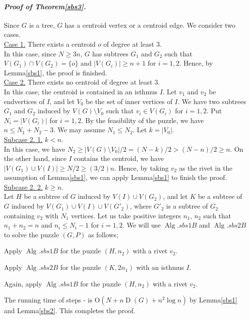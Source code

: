 \documentclass[letter,11pt]{article}
\newcommand{\white}{\qquad{\framebox{\rule{0pt}{4pt}}}}
\newcommand{\owari}{\hfill\white}
\theoremstyle{definition}
\theoremstyle{definition}
\DeclareMathOperator{\Alg}{Alg}
\DeclareMathOperator{\D}{D}
\newcommand{\1}{\boldmath$~1~$\unboldmath}
\newcommand{\Ord}{\mathrm{O}}
\newcommand{\qedgo}{\vspace{0.35cm}}
\newcommand{\tume}{\hspace*{0.2em}}
\newcommand{\maru}[1]{{\ooalign{\hfill$\small#1$\hfill\crcr\scalebox{1.3}{$\bigcirc$}}}}
\newenvironment{alg-enumerate}{%
  \begin{enumerate}%
   \renewcommand{\theenumi}{\arabic{enumi}}%
   \renewcommand{\labelenumi}{\rm{{\maru{\theenumi}}\tume\/}}%
   \renewcommand{\labelenumii}{\rm{$(${\maru{\theenumi}}-\theenumii$)$\tume\/}}%
 }{\end{enumerate}%
}
\newenvironment{Proofof}[1]{\expandafter
\paragraph{{\it Proof of #1.}}}{\hspace{5mm}\owari\qedgo}
\begin{document}
\begin{Proofof}{Theorem\tume\ref{sbs3}}
Since $G$ is a tree, $G$ has a centroid vertex or a centroid edge.
We consider two cases.
\medskip\\
\underline{Case 1.} There exists a centroid $o$ of degree at least $3$.
\medskip\\
In this case, since $N \ge 3n$, $G$ has subtrees $G_1$ and $G_2$ such that $V(G_1) \cap V(G_2) = \{ o \}$ and $|V(G_i)| \ge n + 1$ for $i=1, 2$.
Hence, by Lemma\tume\ref{sbs1}, the proof is finished.
\medskip\\
\underline{Case 2.} There exists no centroid of degree at least $3$.
\medskip\\  
In this case, the centroid is contained in an isthmus $I$.
Let $v_1$ and $v_2$ be endvertices of $I$, and let $V_0$ be the set of inner vertices of $I$.
We have two subtrees $G_1$ and $G_2$ induced by $V(G) \setminus V_0$ such that $v_i \in V(G_i)$ for $i = 1, 2$.
Put $N_i = |V(G_i)|$ for $i = 1, 2$.
By the feasibility of the puzzle, we have $n \le N_1 + N_2 - 3$.
We may assume $N_1 \le N_2$. 
Let $k= |V_0|$. 
\medskip\\
\underline{Subcase 2. 1.} $k < n$.
\medskip\\  
In this case, we have $N_2 \ge |V(G) \setminus V_0|/2 = (N-k)/2 > (N - n)/2 \ge n$.
On the other hand, since $I$ contains the centroid, we have $|V(G_1) \cup V(I)| \ge N/2 \ge (3/2)n$.
Hence, by taking $v_2$ as the rivet in the assumption of Lemma\tume\ref{sbs1}, we can apply Lemma\tume\ref{sbs1} to finish the proof.
\medskip\\
\underline{Subcase 2. 2.} $k \ge n$.
\medskip\\
Let $H$ be a subtree of $G$ induced by $V(I) \cup V(G_2)$, and 
let $K$ be a subtree of $G$ induced by $V(G_1) \cup V(I) \cup V(G'_2)$, 
where $G'_2$ is a subtree of $G_2$ containing $v_2$ with $N_1$ vertices.
Let us take positive integers $n_1$, $n_2$ such that $n_1 + n_2 = n$ and $n_i \le N_i - 1$ for $i=1,2$.  
We will use $\Alg.sbs1B$ and $\Alg.sbs2B$ to solve the puzzle $(G,P)$ as follows;
\begin{alg-enumerate}
\item{Apply $\Alg.sbs1B$ for the puzzle $(H, n_2)$ with a rivet $v_2$.}
\item{Apply $\Alg.sbs2B$ for the puzzle $(K, 2n_1)$ with an isthmus $I$.}
\item{Again, apply $\Alg.sbs1B$ for the puzzle $(H, n_2)$ with a rivet $v_2$.}
\end{alg-enumerate}
The running time of steps \maru{1} - \maru{3} is $\Ord(N + n\D(G) + n^2\log n)$ by Lemma\tume\ref{sbs1} and Lemma\tume\ref{sbs2}.
This completes the proof.
\end{Proofof}
\end{document}
